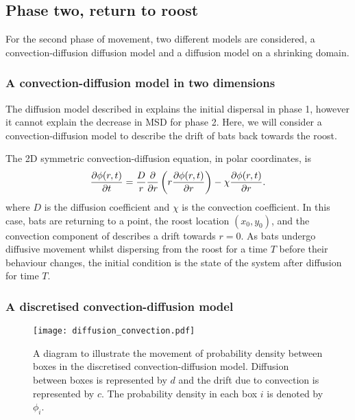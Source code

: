 
\subsection{Phase two, return to roost}

For the second phase of movement, two different models are considered, a convection-diffusion diffusion model and a diffusion model on a shrinking domain.

\subsubsection{A convection-diffusion model in two dimensions}

The diffusion model described in  explains the initial dispersal in phase 1, however it cannot explain the decrease in MSD for phase 2. Here, we will consider a convection-diffusion model to describe the drift of bats back towards the roost.

The 2D symmetric convection-diffusion equation, in polar coordinates, is
%
\begin{equation}
  \frac{\partial \phi(r,t)}{\partial t} = \frac{D}{r} \frac{\partial }{\partial r}\left(r \frac{\partial \phi(r,t)}{\partial r} \right) - \chi \frac{\partial \phi(r,t)}{\partial r}.
  \label{eqn:convection}
\end{equation}
%
where $D$ is the diffusion coefficient and $\chi$ is the convection coefficient. In this case, bats are returning to a point, the roost location $(x_0,y_0)$, and the convection component of  describes a drift towards $r=0$. As bats undergo diffusive movement whilst dispersing from the roost for a time $T$ before their behaviour changes, the initial condition is the state of the system after diffusion for time $T$.

\subsubsection{A discretised convection-diffusion model}


 \begin{figure} [b]
     \centering
         \texttt{[image: diffusion\_convection.pdf]}
         \caption{A diagram to illustrate the movement of probability density between boxes in the discretised convection-diffusion model. Diffusion between boxes is represented by $d$ and the drift due to convection is represented by $c$. The probability density in each box $i$ is denoted by $\phi_i$.}
     \label{fig:convection_diffusion_diag}
 \end{figure}

